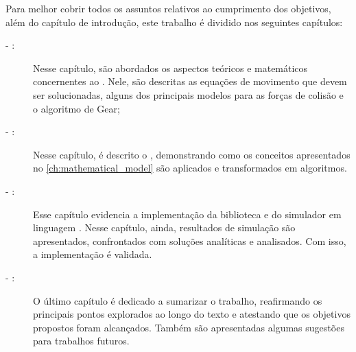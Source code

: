 Para melhor cobrir todos os assuntos relativos ao cumprimento dos objetivos, além do capítulo de introdução, este trabalho é dividido nos seguintes capítulos:
\begin{description}
	\item[ - :] Nesse capítulo, são abordados os aspectos teóricos e matemáticos concernentes ao \DEM{}. Nele, são descritas as equações de movimento que devem ser solucionadas, alguns dos principais modelos para as forças de colisão e o algoritmo de Gear;
	\item[ - :] Nesse capítulo, é descrito o \DEM{}, demonstrando como os conceitos apresentados no \cref{ch:mathematical_model} são aplicados e transformados em algoritmos.
	\item[ - :] Esse capítulo evidencia a implementação da biblioteca e do simulador em linguagem \CPP{}. Nesse capítulo, ainda, resultados de simulação são apresentados, confrontados com soluções analíticas e analisados. Com isso, a implementação é validada.
	\item[ - :] O último capítulo é dedicado a sumarizar o trabalho, reafirmando os principais pontos explorados ao longo do texto e atestando que os objetivos propostos foram alcançados. Também são apresentadas algumas sugestões para trabalhos futuros.
\end{description}